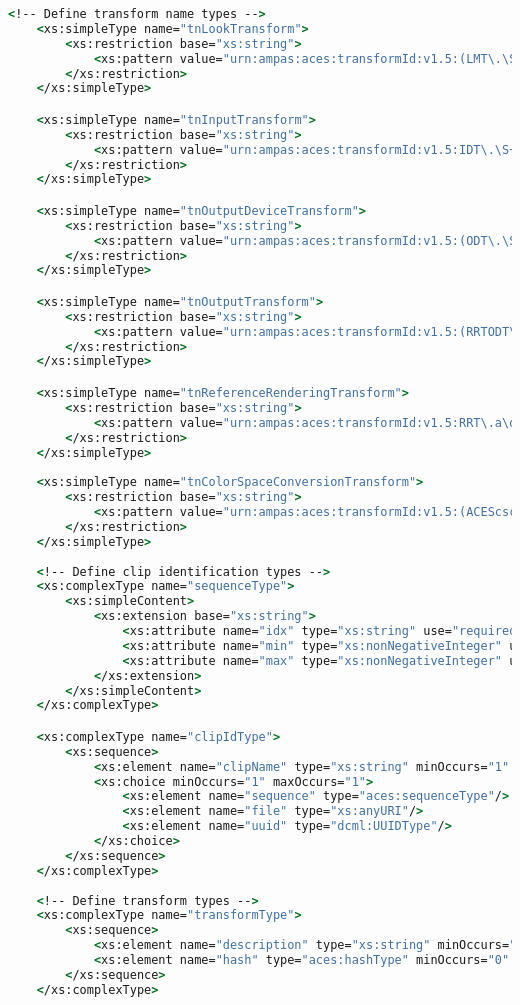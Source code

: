 \begin{lstlisting}[language=csh]
	<!-- Define transform name types -->
	<xs:simpleType name="tnLookTransform">
		<xs:restriction base="xs:string">
			<xs:pattern value="urn:ampas:aces:transformId:v1.5:(LMT\.\S+\.\S+\.a\d+\.v\d+|LMT\.Academy\.\S+\.a\d+\.\d+\.\d+)"/>
		</xs:restriction>
	</xs:simpleType>

	<xs:simpleType name="tnInputTransform">
		<xs:restriction base="xs:string">
			<xs:pattern value="urn:ampas:aces:transformId:v1.5:IDT\.\S+\.\S+\.a\d+\.v\d+"/>
		</xs:restriction>
	</xs:simpleType>

	<xs:simpleType name="tnOutputDeviceTransform">
		<xs:restriction base="xs:string">
			<xs:pattern value="urn:ampas:aces:transformId:v1.5:(ODT\.\S+\.\S+\.a\d+\.v\d+|ODT\.Academy\.\S+\.a\d+\.\d+\.\d+)"/>
		</xs:restriction>
	</xs:simpleType>

	<xs:simpleType name="tnOutputTransform">
		<xs:restriction base="xs:string">
			<xs:pattern value="urn:ampas:aces:transformId:v1.5:(RRTODT\.\S+\.\S+\.a\d+\.v\d+|RRTODT\.Academy\.\S+\.a\d+\.\d+\.\d+)"/>
		</xs:restriction>
	</xs:simpleType>

	<xs:simpleType name="tnReferenceRenderingTransform">
		<xs:restriction base="xs:string">
			<xs:pattern value="urn:ampas:aces:transformId:v1.5:RRT\.a\d+\.\d+\.\d+"/>
		</xs:restriction>
	</xs:simpleType>
	
	<xs:simpleType name="tnColorSpaceConversionTransform">
		<xs:restriction base="xs:string">
			<xs:pattern value="urn:ampas:aces:transformId:v1.5:(ACEScsc\.\S+\.\S+\.a\d+\.v\d+|ACEScsc\.Academy\.\S+\.a\d+\.\d+\.\d+)"/>
		</xs:restriction>
	</xs:simpleType>
	
	<!-- Define clip identification types -->
	<xs:complexType name="sequenceType">
		<xs:simpleContent>
			<xs:extension base="xs:string">
				<xs:attribute name="idx" type="xs:string" use="required"/>
				<xs:attribute name="min" type="xs:nonNegativeInteger" use="required"/>
				<xs:attribute name="max" type="xs:nonNegativeInteger" use="required"/>
			</xs:extension>
		</xs:simpleContent>
	</xs:complexType>

	<xs:complexType name="clipIdType">
		<xs:sequence>
			<xs:element name="clipName" type="xs:string" minOccurs="1" maxOccurs="1"/>
			<xs:choice minOccurs="1" maxOccurs="1">
				<xs:element name="sequence" type="aces:sequenceType"/>
				<xs:element name="file" type="xs:anyURI"/>
				<xs:element name="uuid" type="dcml:UUIDType"/>
			</xs:choice>
		</xs:sequence>
	</xs:complexType>
	
	<!-- Define transform types -->
	<xs:complexType name="transformType">
		<xs:sequence>
			<xs:element name="description" type="xs:string" minOccurs="0" maxOccurs="1"/>
			<xs:element name="hash" type="aces:hashType" minOccurs="0" maxOccurs="1"/>
		</xs:sequence>
	</xs:complexType>


\end{lstlisting}
